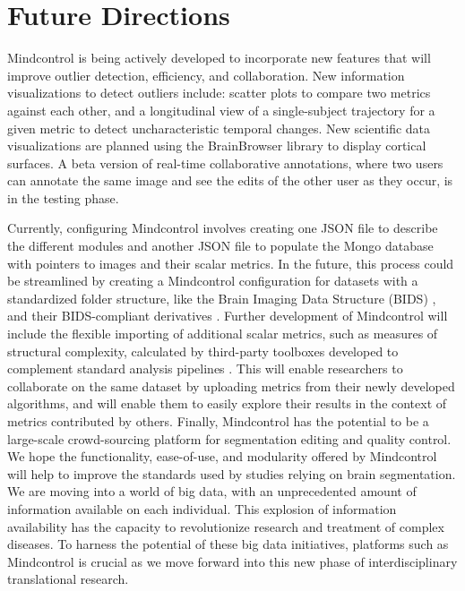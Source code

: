 \section{Future Directions}

Mindcontrol is being actively developed to incorporate new features that will improve outlier detection, efficiency, and collaboration. New information visualizations to detect outliers include: scatter plots to compare two metrics against each other, and a longitudinal view of a single-subject trajectory for a given metric to detect uncharacteristic temporal changes. New scientific data visualizations are planned using the BrainBrowser library \cite{Sherif_2015} to display cortical surfaces. A beta version of real-time collaborative annotations, where two users can annotate the same image and see the edits of the other user as they occur, is in the testing phase. 

Currently, configuring Mindcontrol involves creating one JSON file to describe the different modules and another JSON file to populate the Mongo database with pointers to images and their scalar metrics. In the future, this process could be streamlined by creating a Mindcontrol configuration for datasets with a standardized folder structure, like the Brain Imaging Data Structure (BIDS) \cite{Gorgolewski_2016}, and their BIDS-compliant derivatives \cite{gorgolewski2016bids}. Further development of Mindcontrol will include the flexible importing of additional scalar metrics, such as measures of structural complexity, calculated by third-party toolboxes developed to complement standard analysis pipelines \cite{madan2016,madan2017}. This will enable researchers to collaborate on the same dataset by uploading metrics from their newly developed algorithms, and will enable them to easily explore their results in the context of metrics contributed by others. Finally, Mindcontrol has the potential to be a large-scale crowd-sourcing platform for segmentation editing and quality control. We hope the functionality, ease-of-use, and modularity offered by Mindcontrol will help to improve the standards used by studies relying on brain segmentation. We are moving into a world of big data, with an unprecedented amount of information available on each individual. This explosion of information availability has the capacity to revolutionize research and treatment of complex diseases. To harness the potential of these big data initiatives, platforms such as Mindcontrol is crucial as we move forward into this new phase of interdisciplinary translational research.